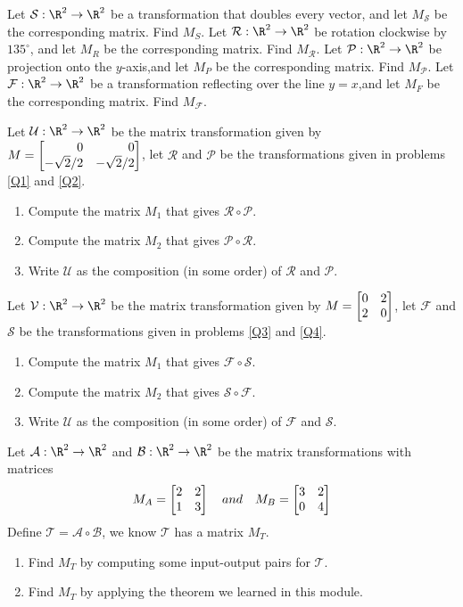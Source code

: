 \begin{exercises}
	\begin{problist}
	    \prob \label{Q1}Let $\mathcal S:\R^2\to\R^2$ be a transformation that doubles every vector, and let $M_{\mathcal S}$ be the corresponding matrix. Find $M_S$.
	    \prob \label{Q2}Let $\mathcal R:\R^2\to\R^2$ be rotation clockwise by $135^\circ$, and let $M_R$ be the corresponding matrix. Find $M_{\mathcal R}$.
	    \prob \label{Q3}Let $\mathcal P:\R^2\to\R^2$ be projection onto the $y$-axis,and let $M_P$ be the corresponding matrix. Find $M_{\mathcal P}$.
	    \prob \label{Q4}Let $\mathcal F:\R^2\to\R^2$ be a transformation reflecting over the line $y=x$,and let $M_F$ be the corresponding matrix. Find $M_{\mathcal F}$.
	    
	    \prob Let $\mathcal U:\R^2\to\R^2$ be the matrix transformation given by $M=\mat{0&0\\-\sqrt{2}/2 & -\sqrt{2}/2}$, let $\mathcal R$ and $\mathcal P$ be the transformations given in problems \ref{Q1} and \ref{Q2}.
		\begin{enumerate}
			\item   Compute the matrix $M_1$ that gives $\mathcal R \circ \mathcal P$.
			\item   Compute the matrix $M_2$ that gives $\mathcal P \circ \mathcal R$.
			\item   Write $\mathcal U$ as the composition (in some order) of $\mathcal R$ and $\mathcal P$.
		\end{enumerate}
		
		\prob Let $\mathcal V:\R^2\to\R^2$ be the matrix transformation given by $M=\mat{0&2\\2&0}$, let $\mathcal F$ and $\mathcal S$ be the transformations given in problems \ref{Q3} and \ref{Q4}.
		\begin{enumerate}
			\item   Compute the matrix $M_1$ that gives $\mathcal F \circ \mathcal S$.
			\item   Compute the matrix $M_2$ that gives $\mathcal S \circ \mathcal F$.
			\item   Write $\mathcal U$ as the composition (in some order) of $\mathcal F$ and $\mathcal S$.
		\end{enumerate}
		    
		\prob Let $\mathcal A: \R^2 \to \R^2$ and $\mathcal B: \R^2 \to \R^2$ be the matrix transformations with matrices
		\[
		    M_A = \mat{2&2\\1&3} \quad and \quad M_B = \mat{3&2\\0&4}
		\]
		Define $\mathcal T = \mathcal A \circ \mathcal B$, we know $\mathcal T$ has a matrix $M_T$. 
		\begin{enumerate}
		    \item Find $M_T$ by computing some input-output pairs for $\mathcal T$.
		    \item Find $M_T$ by applying the theorem we learned in this module. 
		\end{enumerate}
		

\end{problist}
\end{exercises}

